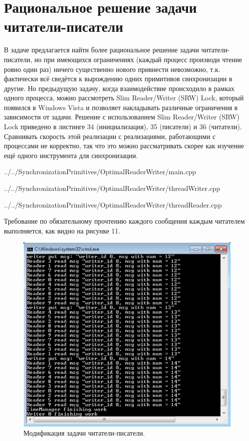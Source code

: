 \documentclass[a4paper, 12pt]{article}		%
\begin{document}
\newpage
\section{Рациональное решение задачи читатели-писатели}

В задаче предлагается найти более рациональное решение задачи читатели-писатели, но при имеющихся ограничениях (каждый процесс производи чтение ровно один раз) ничего существенно нового привнести невозможно, т.к. фактически всё сведётся к вырождению одних примитивов синхронизации в другие. Но предыдущую задачу, когда взаимодействие происходило в рамках одного процесса, можно рассмотреть Slim Reader/Writer (SRW) Lock, который появился в Windows Vista и позволяет накладывать различные ограничения в зависимости от задачи.
Решение с использованием Slim Reader/Writer (SRW) Lock приведено в листинге 34 (инициализация), 35 (писатели) и 36 (читатели). Сравнивать скорость этой реализации с реализациями, работающими с процессами не корректно, так что это можно рассматривать скорее как изучение ещё одного инструмента для синхронизации.


{../../SynchronizationPrimitives/OptimalReaderWriter/main.cpp}
\newpage


{../../SynchronizationPrimitives/OptimalReaderWriter/threadWriter.cpp}
\newpage


{../../SynchronizationPrimitives/OptimalReaderWriter/threadReader.cpp}
\newpage

Требование по обязательному прочтению каждого сообщения каждым читателем выполняется, как видно на рисунке 11.

\begin{figure}[h!]
\centering
\includegraphics[scale=0.9]{res/011}
\caption{Модификация задачи читатели-писатели.}
\end{figure}
\end{document}
